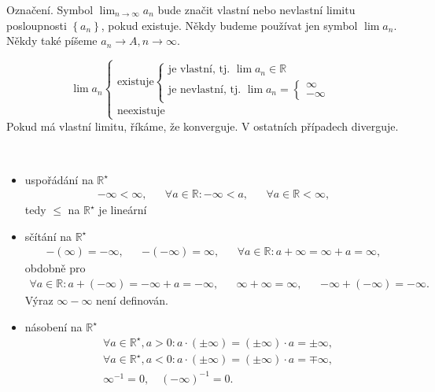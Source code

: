 \begin{poznamka}
	Označení. Symbol $\lim_{n\to \infty} a_n$ bude značit vlastní nebo nevlastní limitu posloupnosti
	$\left \{ a_n \right \} $, pokud existuje. Někdy budeme používat jen symbol $\lim a_n$. Někdy také píšeme
	$a_n \to A, n\to \infty$.
\end{poznamka}

\begin{poznamka}
	$$
	\lim a_n \begin{cases}
		\textrm{existuje} \begin{cases}
			\textrm{je vlastní, tj. } \lim a_n\in \mathbb R \\
			\textrm{je nevlastní, tj. } \lim a_n = \begin{cases}
				\infty \\
				-\infty
			\end{cases}
		\end{cases}\\
		\textrm{neexistuje}
		\end{cases}
	$$
	Pokud má vlastní limitu, říkáme, že konverguje. V ostatních případech diverguje.
\end{poznamka}

\begin{poznamka}\,
\begin{itemize}
	\item uspořádání na $\mathbb R ^\star$
	\begin{align*}
		-\infty < \infty, && \forall a \in \mathbb R : -\infty < a, && \forall a \in \mathbb R  < \infty,
	\end{align*}
	tedy $\leq$ na $\mathbb R ^\star$ je lineární
	\item sčítání na $\mathbb R ^\star$
	\begin{align*}
		-(\infty) = -\infty, && - (-\infty) = \infty, && \forall a \in \mathbb R : a+\infty = \infty + a = \infty,
	\end{align*}
	obdobně pro
	\begin{align*}
		\forall a \in \mathbb R : a + (-\infty) = -\infty + a = -\infty, && \infty + \infty = \infty, && -\infty + (-\infty) = -\infty.
	\end{align*}
	Výraz $\infty - \infty$ není definován.
	\item násobení na $\mathbb R ^\star$
	\begin{align*}
		&\forall a \in \mathbb R ^\star, a>0: a\cdot (\pm\infty) = (\pm \infty) \cdot a = \pm \infty,\\
		&\forall a \in \mathbb R ^\star, a<0: a\cdot (\pm\infty) = (\pm \infty) \cdot a = \mp \infty,\\
		&\infty ^{-1} = 0, \quad (-\infty)^{-1}=0.
\end{align*}
\end{itemize}
\end{poznamka}

